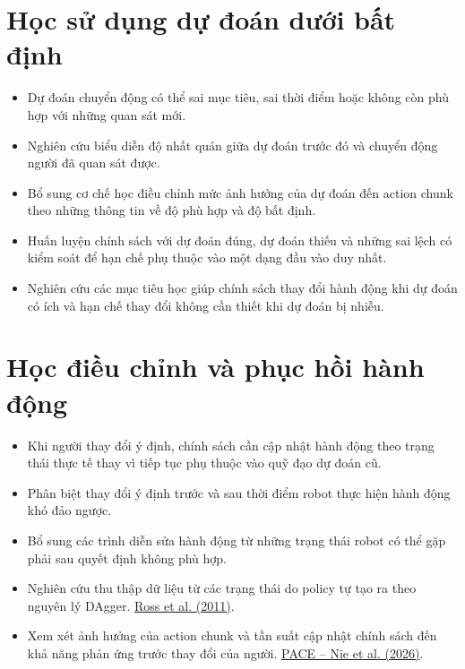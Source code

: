 \section{Học sử dụng dự đoán dưới bất định}

\begin{itemize}
    \item Dự đoán chuyển động có thể sai mục tiêu, sai thời điểm hoặc không còn phù hợp với những quan sát mới.

    \item Nghiên cứu biểu diễn độ nhất quán giữa dự đoán trước đó và chuyển động người đã quan sát được.

    \item Bổ sung cơ chế học điều chỉnh mức ảnh hưởng của dự đoán đến action chunk theo những thông tin về độ phù hợp và độ bất định.

    \item Huấn luyện chính sách với dự đoán đúng, dự đoán thiếu và những sai lệch có kiểm soát để hạn chế phụ thuộc vào một dạng đầu vào duy nhất.

    \item Nghiên cứu các mục tiêu học giúp chính sách thay đổi hành động khi dự đoán có ích và hạn chế thay đổi không cần thiết khi dự đoán bị nhiễu.
\end{itemize}


\section{Học điều chỉnh và phục hồi hành động}

\begin{itemize}
    \item Khi người thay đổi ý định, chính sách cần cập nhật hành động theo trạng thái thực tế thay vì tiếp tục phụ thuộc vào quỹ đạo dự đoán cũ.

    \item Phân biệt thay đổi ý định trước và sau thời điểm robot thực hiện hành động khó đảo ngược.

    \item Bổ sung các trình diễn sửa hành động từ những trạng thái robot có thể gặp phải sau quyết định không phù hợp.

    \item Nghiên cứu thu thập dữ liệu từ các trạng thái do policy tự tạo ra theo nguyên lý DAgger.
    \href{https://proceedings.mlr.press/v15/ross11a.html}{Ross et al. (2011)}.

    \item Xem xét ảnh hưởng của action chunk và tần suất cập nhật chính sách đến khả năng phản ứng trước thay đổi của người.
    \href{https://arxiv.org/abs/2606.00537}{PACE -- Nie et al. (2026)}.
\end{itemize}


